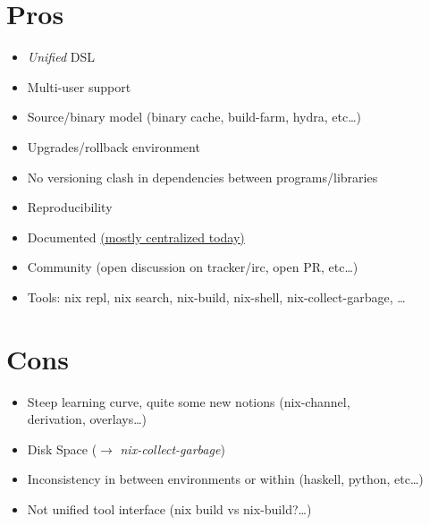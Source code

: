 \documentclass[smaller]{beamer}
\begin{document}
\section{Pros}
\label{sec:orgc0b92b5}
\begin{itemize}
\item \alert{\alert{\emph{Unified} DSL}}\\
\item \alert{\alert{Multi-user}} support\\
\item \alert{\alert{Source/binary}} model (binary cache, build-farm, hydra, etc\ldots{})\\
\item \alert{\alert{Upgrades/rollback}} environment\\
\item \alert{\alert{No versioning clash}} in dependencies between programs/libraries\\
\item \alert{\alert{Reproducibility}}\\
\item \alert{\alert{Documented}} \href{https://nixos.org/}{(mostly centralized today)}\\
\item \alert{\alert{Community}} (open discussion on tracker/irc, open PR, etc\ldots{})\\
\item \alert{\alert{Tools}}: nix repl, nix search, nix-build, nix-shell, nix-collect-garbage, \ldots{}\\
\end{itemize}

\section{Cons}
\label{sec:org5bd5de9}

\begin{itemize}
\item \alert{\alert{Steep}} learning curve, quite some new notions (nix-channel,\\
derivation, overlays\ldots{})\\
\item \alert{\alert{Disk Space}} (\(\rightarrow\) \emph{nix-collect-garbage})\\
\item Inconsistency in between environments or within (haskell, python, etc\ldots{})\\
\item Not unified tool interface (nix build vs nix-build?\ldots{})\\
\end{itemize}
\end{document}
